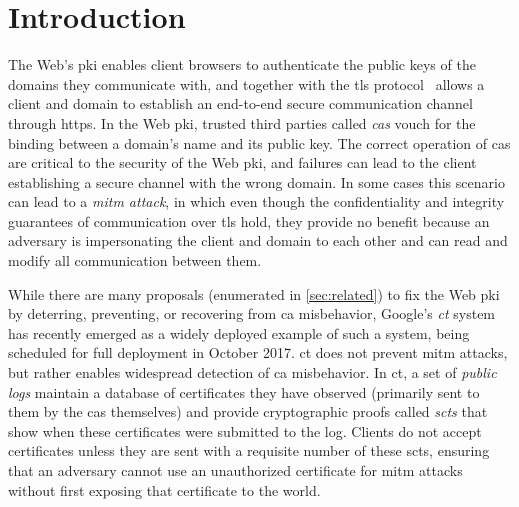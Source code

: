 \section{Introduction}
\label{sec:intro}


The Web's \ac{pki} enables client browsers to authenticate the public keys of
the domains they communicate with, and together with the \ac{tls}
protocol~\cite{rfc5246} allows a client and domain to establish an end-to-end
secure communication channel through \acs{https}. In the Web \ac{pki},
trusted third parties called \emph{\acp{ca}} vouch for the binding between a
domain's name and its public key. The correct operation of \acp{ca} are critical
to the security of the Web \ac{pki}, and failures can lead to the client
establishing a secure channel with the wrong domain. In some cases this
scenario can lead to a \emph{\ac{mitm} attack}, in which even though the
confidentiality and integrity guarantees of communication over \ac{tls} hold,
they provide no benefit because an adversary is impersonating the client and
domain to each other and can read and modify all communication between them.

While there are many proposals (enumerated in \autoref{sec:related}) to fix the
Web \ac{pki} by deterring, preventing, or recovering from \ac{ca} misbehavior,
Google's \emph{\ac{ct}} system~\cite{rfc6962} has recently emerged as a widely
deployed example of such a system, being scheduled for full deployment in
October 2017. \ac{ct} does not prevent \ac{mitm} attacks, but rather enables
widespread detection of \ac{ca} misbehavior. In \ac{ct}, a set of \emph{public
logs} maintain a database of certificates they have observed (primarily sent to
them by the \acp{ca} themselves) and provide cryptographic proofs called
\emph{\acp{sct}} that show when these certificates were submitted to the log.
Clients do not accept certificates unless they are sent with a requisite number
of these \acp{sct}, ensuring that an adversary cannot use an unauthorized
certificate for \ac{mitm} attacks without first exposing that certificate to the
world.


